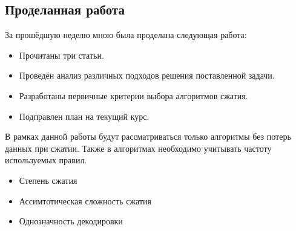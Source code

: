 \documentclass[a4peper, 12pt, titlepage, finall]{extreport}
\begin{document}
        \subsection{Проделанная работа}
            За прошёдшую неделю мною была проделана следующая работа:
            \begin{itemize}
                \item Прочитаны три статьи.
                \item Проведён анализ различных подходов решения поставленной задачи.
                \item Разработаны первичные критерии выбора алгоритмов сжатия.
                \item Подправлен план на текущий курс.
            \end{itemize}
            В рамках данной работы будут рассматриваться только алгоритмы без потерь данных при сжатии.
            Также в алгоритмах необходимо учитывать частоту используемых правил.
            \begin{itemize}
                \item Степень сжатия
                \item Ассимтотическая сложность сжатия
                \item Однозначность декодировки
            \end{itemize}
\end{document}
